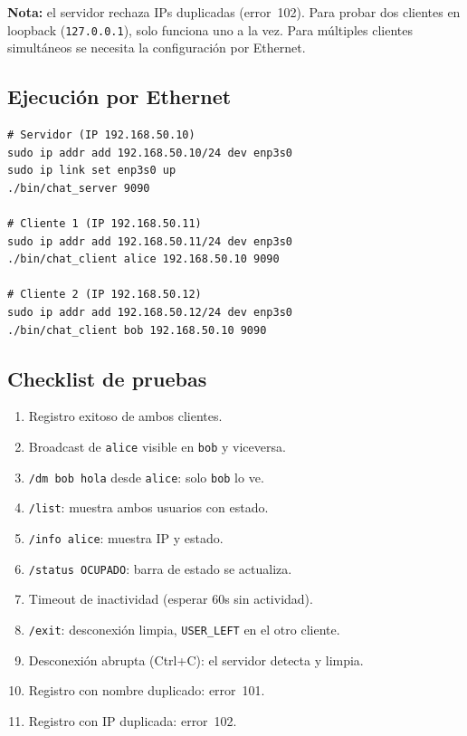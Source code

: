 \documentclass[12pt,a4paper]{article}
\begin{document}
\textbf{Nota:} el servidor rechaza IPs duplicadas (error~102).  Para probar dos
clientes en loopback (\texttt{127.0.0.1}), solo funciona uno a la vez.  Para
múltiples clientes simultáneos se necesita la configuración por Ethernet.

\subsection{Ejecución por Ethernet}

\begin{lstlisting}[style=protocol]
# Servidor (IP 192.168.50.10)
sudo ip addr add 192.168.50.10/24 dev enp3s0
sudo ip link set enp3s0 up
./bin/chat_server 9090

# Cliente 1 (IP 192.168.50.11)
sudo ip addr add 192.168.50.11/24 dev enp3s0
./bin/chat_client alice 192.168.50.10 9090

# Cliente 2 (IP 192.168.50.12)
sudo ip addr add 192.168.50.12/24 dev enp3s0
./bin/chat_client bob 192.168.50.10 9090
\end{lstlisting}

\subsection{Checklist de pruebas}

\begin{enumerate}[nosep]
    \item Registro exitoso de ambos clientes.
    \item Broadcast de \texttt{alice} visible en \texttt{bob} y viceversa.
    \item \texttt{/dm bob hola} desde \texttt{alice}: solo \texttt{bob} lo ve.
    \item \texttt{/list}: muestra ambos usuarios con estado.
    \item \texttt{/info alice}: muestra IP y estado.
    \item \texttt{/status OCUPADO}: barra de estado se actualiza.
    \item Timeout de inactividad (esperar 60s sin actividad).
    \item \texttt{/exit}: desconexión limpia, \texttt{USER\_LEFT} en el otro cliente.
    \item Desconexión abrupta (Ctrl+C): el servidor detecta y limpia.
    \item Registro con nombre duplicado: error~101.
    \item Registro con IP duplicada: error~102.
\end{enumerate}
\end{document}
